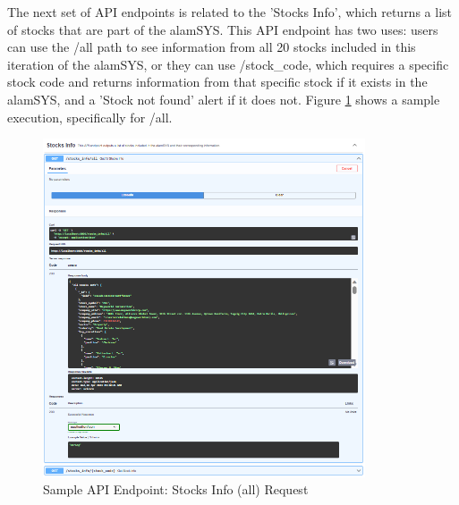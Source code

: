 The next set of API endpoints is related to the 'Stocks Info', which returns a 
list of stocks that are part of the alamSYS. This API endpoint has two uses: 
users can use the /all path to see information from all 20 stocks included 
in this iteration of the alamSYS, or they can use /stock\_code, which 
requires a specific stock code and returns information from that specific 
stock if it exists in the alamSYS, and a 'Stock not found' alert if it does not.
Figure \ref{fig:alamAPI_info} shows a sample execution, specifically for /all.
\begin{figure}[ht]
    \centering
    \includegraphics[width=0.85\textwidth]{./assets/Chapter_4/Documentation/alamAPI_info.png}
    \caption{Sample API Endpoint: Stocks Info (all) Request}
    \label{fig:alamAPI_info}
\end{figure}
\FloatBarrier

